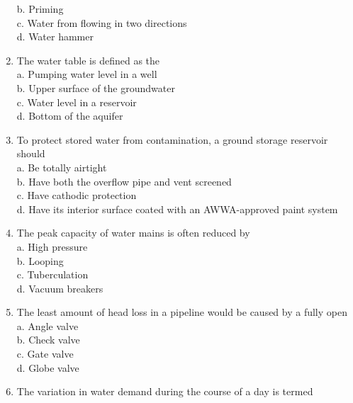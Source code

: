 \documentclass{article}
\begin{document}
\begin{enumerate}[1.]
b. Priming\\

c. Water from flowing in two directions\\

d. Water hammer\\

\item The water table is defined as the\\
a. Pumping water level in a well\\
b. Upper surface of the groundwater\\
c. Water level in a reservoir\\
d. Bottom of the aquifer\\

  \item To protect stored water from contamination, a ground storage reservoir should\\


a. Be totally airtight\\

b. Have both the overflow pipe and vent screened\\

c. Have cathodic protection\\

d. Have its interior surface coated with an AWWA-approved paint system\\

\item The peak capacity of water mains is often reduced by\\

a. High pressure\\

b. Looping\\

c. Tuberculation\\

d. Vacuum breakers\\

\item The least amount of head loss in a pipeline would be caused by a fully open\\
a. Angle valve\\
b. Check valve\\
c. Gate valve\\
d. Globe valve\\

  \item The variation in water demand during the course of a day is termed



\end{enumerate}
\end{document}
